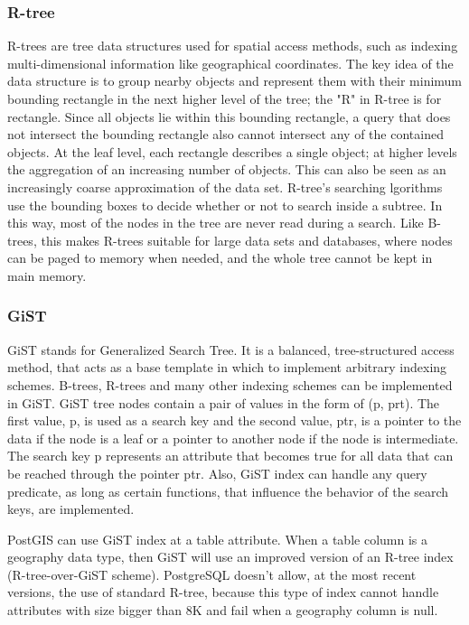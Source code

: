 \subsubsection{R-tree}

R-trees \cite{14} are tree data structures used for spatial access methods, such as indexing multi-dimensional information like geographical coordinates. 
The key idea of the data structure is to group nearby objects and represent them with their minimum bounding rectangle in the next higher level of the tree; 
the "R" in R-tree is for rectangle. Since all objects lie within this bounding rectangle, a query that does not intersect the bounding rectangle also cannot 
intersect any of the contained objects. At the leaf level, each rectangle describes a single object; at higher levels the aggregation of an increasing number 
of objects. This can also be seen as an increasingly coarse approximation of the data set. 
R-tree's searching lgorithms use the bounding boxes to decide whether or not to search inside a subtree. In this way, most of the nodes in the tree are never 
read during a search. Like B-trees, this makes R-trees suitable for large data sets and databases, where nodes can be paged to memory when needed, and the whole 
tree cannot be kept in main memory. 

\subsubsection{GiST}

GiST \cite{15} stands for Generalized Search Tree. It is a balanced, tree-structured access method, that acts as a base template in which to implement arbitrary 
indexing schemes. B-trees, R-trees and many other indexing schemes can be implemented in GiST. GiST tree nodes contain a pair of values in the form of (p, prt). 
The first value, p, is used as a search key and the second value, ptr, is a pointer to the data if the node is a leaf or a pointer to another node 
if the node is intermediate. The search key p represents an attribute that becomes true for all data that can be reached through the pointer ptr. 
Also, GiST index can handle any query predicate, as long as certain functions, that influence the behavior of the search keys, are implemented. 

PostGIS can use GiST index at a table attribute. When a table column is a geography data type, then GiST will use an improved version of an R-tree index 
(R-tree-over-GiST scheme). PostgreSQL doesn't allow, at the most recent versions, the use of standard R-tree, because this type of index 
cannot handle attributes with size bigger than 8K and fail when a geography column is null. 


